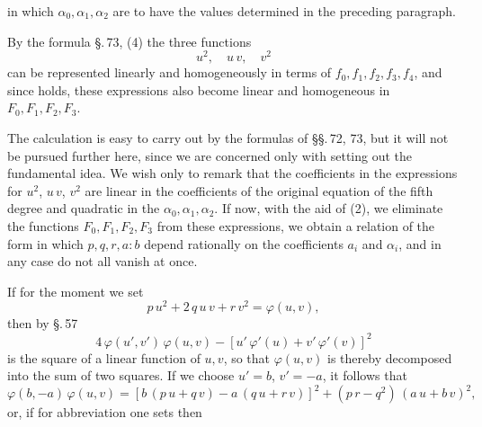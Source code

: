in which $\alpha_0, \alpha_1, \alpha_2$ are to have the values determined in the preceding paragraph.

By the formula \S.\,73, (4) the three functions
\[
u^2, \quad u\,v, \quad v^2
\]
can be represented linearly and homogeneously in terms of $f_0, f_1, f_2, f_3, f_4$, and since
holds, these expressions also become linear and homogeneous in $F_0, F_1, F_2, F_3$.

The calculation is easy to carry out by the formulas of \S\S.\,72, 73, but it will not be pursued further here, since we are concerned only with setting out the fundamental idea. We wish only to remark that the coefficients in the expressions for $u^2$, $u\,v$, $v^2$ are linear in the coefficients of the original equation of the fifth degree and quadratic in the $\alpha_0, \alpha_1, \alpha_2$. If now, with the aid of (2), we eliminate the functions $F_0, F_1, F_2, F_3$ from these expressions, we obtain a relation of the form
in which $p, q, r, a: b$ depend rationally on the coefficients $a_i$ and $\alpha_i$, and in any case do not all vanish at once.

If for the moment we set
\[
p\,u^2 + 2\,q\,u\,v + r\,v^2 = \varphi(u,v),
\]
then by \S.\,57
\[
4\,\varphi(u',v')\,\varphi(u,v) - [u'\,\varphi'(u) + v'\,\varphi'(v)]^2
\]
is the square of a linear function of $u, v$, so that $\varphi(u,v)$ is thereby decomposed into the sum of two squares. If we choose $u' = b$, $v' = -a$, it follows that
\[
\varphi(b,-a)\,\varphi(u,v) = [b\,(p\,u + q\,v) - a\,(q\,u + r\,v)]^2 + (p\,r - q^2)\,(a\,u + b\,v)^2,
\]
or, if for abbreviation one sets
then
